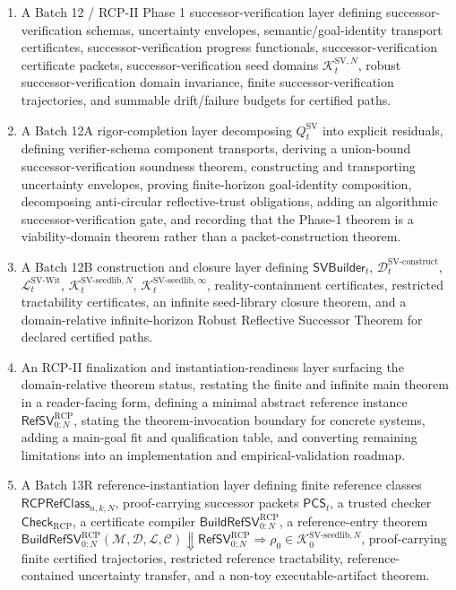 \documentclass[11pt]{article}
\newcommand{\Lcal}{\mathcal{L}}
\newcommand{\1}{\mathbf{1}}
\newcommand{\RCP}{\mathrm{RCP}}
\providecommand{\Dcal}{\mathcal{D}}
\providecommand{\Kcal}{\mathcal{K}}
\begin{document}
\begin{enumerate}[label=(\roman*)]
    \item A Batch 12 / RCP-II Phase 1 successor-verification layer defining successor-verification schemas, uncertainty envelopes, semantic/goal-identity transport certificates, successor-verification progress functionals, successor-verification certificate packets, successor-verification seed domains \(\Kcal_t^{\mathrm{SV},N}\), robust successor-verification domain invariance, finite successor-verification trajectories, and summable drift/failure budgets for certified paths.
    \item A Batch 12A rigor-completion layer decomposing \(Q_t^{\mathrm{SV}}\) into explicit residuals, defining verifier-schema component transports, deriving a union-bound successor-verification soundness theorem, constructing and transporting uncertainty envelopes, proving finite-horizon goal-identity composition, decomposing anti-circular reflective-trust obligations, adding an algorithmic successor-verification gate, and recording that the Phase-1 theorem is a viability-domain theorem rather than a packet-construction theorem.
    \item A Batch 12B construction and closure layer defining \(\mathsf{SVBuilder}_t\), \(\Dcal_t^{\mathrm{SV\mbox{-}construct}}\), \(\Lcal_t^{\mathrm{SV\mbox{-}Wit}}\), \(\Kcal_t^{\mathrm{SV\mbox{-}seedlib},N}\), \(\Kcal_t^{\mathrm{SV\mbox{-}seedlib},\infty}\), reality-containment certificates, restricted tractability certificates, an infinite seed-library closure theorem, and a domain-relative infinite-horizon Robust Reflective Successor Theorem for declared certified paths.
    \item An RCP-II finalization and instantiation-readiness layer surfacing the domain-relative theorem status, restating the finite and infinite main theorem in a reader-facing form, defining a minimal abstract reference instance \(\mathsf{RefSV}_{0:N}^{\RCP}\), stating the theorem-invocation boundary for concrete systems, adding a main-goal fit and qualification table, and converting remaining limitations into an implementation and empirical-validation roadmap.
    \item A Batch 13R reference-instantiation layer defining finite reference classes \(\mathsf{RCPRefClass}_{n,k,N}\), proof-carrying successor packets \(\mathsf{PCS}_t\), a trusted checker \(\mathsf{Check}_{\RCP}\), a certificate compiler \(\mathsf{BuildRefSV}_{0:N}^{\RCP}\), a reference-entry theorem \(\mathsf{BuildRefSV}_{0:N}^{\RCP}(\mathcal M,\mathcal D,\mathcal L,\mathcal C)\Downarrow\mathsf{RefSV}_{0:N}^{\RCP}\Rightarrow\rho_0\in\Kcal_0^{\mathrm{SV\mbox{-}seedlib},N}\), proof-carrying finite certified trajectories, restricted reference tractability, reference-contained uncertainty transfer, and a non-toy executable-artifact theorem.

\end{enumerate}
\end{document}
